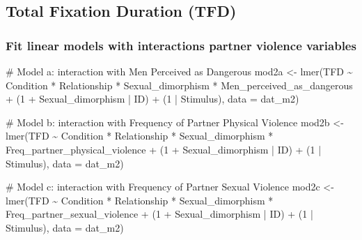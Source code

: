 \documentclass[
  bookmarksnumbered]{article}
\newenvironment{Shaded}{\begin{snugshade}}{\end{snugshade}}
\newcommand{\AttributeTok}[1]{\textcolor[rgb]{0.80,0.80,0.80}{#1}}
\newcommand{\CommentTok}[1]{\textcolor[rgb]{0.50,0.62,0.50}{#1}}
\newcommand{\DecValTok}[1]{\textcolor[rgb]{0.86,0.86,0.80}{#1}}
\newcommand{\FunctionTok}[1]{\textcolor[rgb]{0.94,0.94,0.56}{#1}}
\newcommand{\NormalTok}[1]{\textcolor[rgb]{0.80,0.80,0.80}{#1}}
\newcommand{\OtherTok}[1]{\textcolor[rgb]{0.94,0.94,0.56}{#1}}
\newcommand{\SpecialCharTok}[1]{\textcolor[rgb]{0.86,0.64,0.64}{#1}}
\begin{document}
\subsection{Total Fixation Duration (TFD)}\label{total-fixation-duration-tfd-1}

\subsubsection{Fit linear models with interactions partner violence variables}\label{fit-linear-models-with-interactions-partner-violence-variables-1}

\begin{Shaded}
\begin{Highlighting}[]
\CommentTok{\# Model a: interaction with Men Perceived as Dangerous}
\NormalTok{mod2a }\OtherTok{\textless{}{-}} \FunctionTok{lmer}\NormalTok{(TFD }\SpecialCharTok{\textasciitilde{}}
\NormalTok{                Condition }\SpecialCharTok{*}\NormalTok{ Relationship }\SpecialCharTok{*}\NormalTok{ Sexual\_dimorphism }\SpecialCharTok{*}\NormalTok{ Men\_perceived\_as\_dangerous }\SpecialCharTok{+}
\NormalTok{                (}\DecValTok{1} \SpecialCharTok{+}\NormalTok{ Sexual\_dimorphism }\SpecialCharTok{|}\NormalTok{ ID) }\SpecialCharTok{+}\NormalTok{ (}\DecValTok{1} \SpecialCharTok{|}\NormalTok{ Stimulus), }
              \AttributeTok{data =}\NormalTok{ dat\_m2)}

\CommentTok{\# Model b: interaction with Frequency of Partner Physical Violence}
\NormalTok{mod2b }\OtherTok{\textless{}{-}} \FunctionTok{lmer}\NormalTok{(TFD }\SpecialCharTok{\textasciitilde{}}
\NormalTok{                Condition }\SpecialCharTok{*}\NormalTok{ Relationship }\SpecialCharTok{*}\NormalTok{ Sexual\_dimorphism }\SpecialCharTok{*}\NormalTok{ Freq\_partner\_physical\_violence }\SpecialCharTok{+}
\NormalTok{                (}\DecValTok{1} \SpecialCharTok{+}\NormalTok{ Sexual\_dimorphism }\SpecialCharTok{|}\NormalTok{ ID) }\SpecialCharTok{+}\NormalTok{ (}\DecValTok{1} \SpecialCharTok{|}\NormalTok{ Stimulus), }
              \AttributeTok{data =}\NormalTok{ dat\_m2)}

\CommentTok{\# Model c: interaction with Frequency of Partner Sexual Violence}
\NormalTok{mod2c }\OtherTok{\textless{}{-}} \FunctionTok{lmer}\NormalTok{(TFD }\SpecialCharTok{\textasciitilde{}}
\NormalTok{                Condition }\SpecialCharTok{*}\NormalTok{ Relationship }\SpecialCharTok{*}\NormalTok{ Sexual\_dimorphism }\SpecialCharTok{*}\NormalTok{ Freq\_partner\_sexual\_violence }\SpecialCharTok{+}
\NormalTok{                (}\DecValTok{1} \SpecialCharTok{+}\NormalTok{ Sexual\_dimorphism }\SpecialCharTok{|}\NormalTok{ ID) }\SpecialCharTok{+}\NormalTok{ (}\DecValTok{1} \SpecialCharTok{|}\NormalTok{ Stimulus), }
              \AttributeTok{data =}\NormalTok{ dat\_m2)}


\end{Highlighting}
\end{Shaded}
\end{document}
